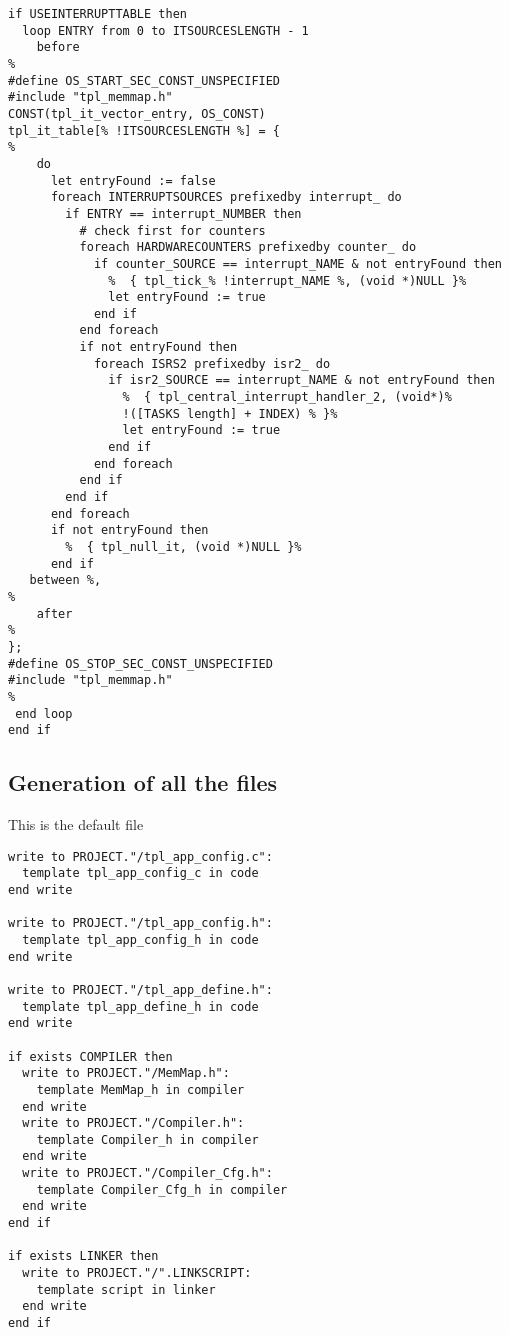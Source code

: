 \begin{lstlisting}
if USEINTERRUPTTABLE then
  loop ENTRY from 0 to ITSOURCESLENGTH - 1
    before
%
#define OS_START_SEC_CONST_UNSPECIFIED
#include "tpl_memmap.h"
CONST(tpl_it_vector_entry, OS_CONST)
tpl_it_table[% !ITSOURCESLENGTH %] = {
%
    do
      let entryFound := false
      foreach INTERRUPTSOURCES prefixedby interrupt_ do
        if ENTRY == interrupt_NUMBER then
          # check first for counters
          foreach HARDWARECOUNTERS prefixedby counter_ do
            if counter_SOURCE == interrupt_NAME & not entryFound then
              %  { tpl_tick_% !interrupt_NAME %, (void *)NULL }%
              let entryFound := true
            end if
          end foreach
          if not entryFound then
            foreach ISRS2 prefixedby isr2_ do
              if isr2_SOURCE == interrupt_NAME & not entryFound then
                %  { tpl_central_interrupt_handler_2, (void*)%
                !([TASKS length] + INDEX) % }%
                let entryFound := true
              end if
            end foreach
          end if
        end if
      end foreach
      if not entryFound then
        %  { tpl_null_it, (void *)NULL }%
      end if
   between %,
%
    after
%
};
#define OS_STOP_SEC_CONST_UNSPECIFIED
#include "tpl_memmap.h"
%
 end loop
end if
\end{lstlisting}

\subsection{Generation of all the files}

This is the default  file

\begin{lstlisting}
write to PROJECT."/tpl_app_config.c":
  template tpl_app_config_c in code
end write

write to PROJECT."/tpl_app_config.h":
  template tpl_app_config_h in code
end write

write to PROJECT."/tpl_app_define.h":
  template tpl_app_define_h in code
end write

if exists COMPILER then
  write to PROJECT."/MemMap.h":
    template MemMap_h in compiler
  end write
  write to PROJECT."/Compiler.h":
    template Compiler_h in compiler
  end write
  write to PROJECT."/Compiler_Cfg.h":
    template Compiler_Cfg_h in compiler
  end write
end if

if exists LINKER then
  write to PROJECT."/".LINKSCRIPT:
    template script in linker
  end write
end if
\end{lstlisting}
